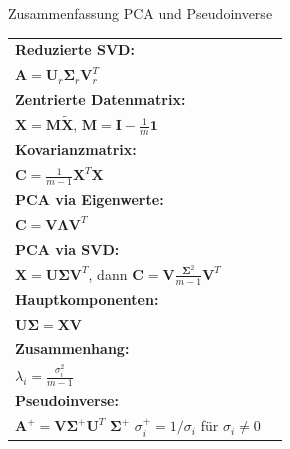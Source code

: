 \documentclass[a4paper, fontsize=7pt]{scrartcl}
\renewcommand*{\arraystretch}{1.5}
\begin{document}
\begin{mainbox}{Zusammenfassung PCA und Pseudoinverse}
\renewcommand*{\arraystretch}{1.3}
\begin{tabularx}{\linewidth}{lX}
\textbf{Reduzierte SVD:} \\
$\mathbf{A} = \mathbf{U}_r\mathbf{\Sigma}_r\mathbf{V}_r^T$ \\
\textbf{Zentrierte Datenmatrix:} \\
$\mathbf{X} = \mathbf{M}\tilde{\mathbf{X}}$, $\mathbf{M} = \mathbf{I} - \frac{1}{m}\mathbf{1}$ \\
\textbf{Kovarianzmatrix:} \\
$\mathbf{C} = \frac{1}{m-1}\mathbf{X}^T\mathbf{X}$ \\
\textbf{PCA via Eigenwerte:} \\
$\mathbf{C} = \mathbf{V\Lambda V}^T$ \\
\textbf{PCA via SVD:} \\
$\mathbf{X} = \mathbf{U\Sigma V}^T$, dann $\mathbf{C} = \mathbf{V}\frac{\mathbf{\Sigma}^2}{m-1}\mathbf{V}^T$ \\
\textbf{Hauptkomponenten:} \\
$\mathbf{U\Sigma} = \mathbf{XV}$ \\
\textbf{Zusammenhang:} \\
$\lambda_i = \frac{\sigma_i^2}{m-1}$ \\
\textbf{Pseudoinverse:} \\
$\mathbf{A}^+ = \mathbf{V\Sigma}^+\mathbf{U}^T$ \textbf{$\mathbf{\Sigma}^+$} $\sigma_i^+ = 1/\sigma_i$ für $\sigma_i \neq 0$
\end{tabularx}
\end{mainbox}
\end{document}
